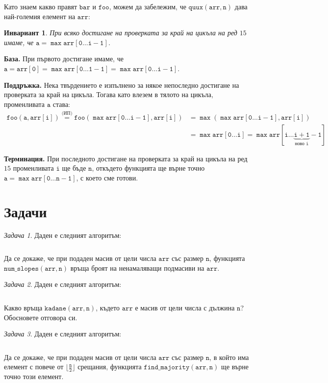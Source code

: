 \documentclass{article}
\theoremstyle{definition}
\theoremstyle{plain}
\newtheorem*{invariant}{Инвариант}
\theoremstyle{remark}
\newtheorem{problem}{Задача}
\theoremstyle{definition}
\begin{document}
Като знаем какво правят $\mathtt{bar}$ и $\mathtt{foo}$, можем да забележим, че $\mathtt{quux(arr, n)}$ дава най-големия елемент на $\mathtt{arr}$:
\begin{invariant}
    При всяко достигане на проверката за край на цикъла на ред $15$ имаме, че $\mathtt{a = \max arr[0 \dots i - 1]}$.
\end{invariant}

\textbf{База.}
При първото достигане имаме, че $\mathtt{a = arr[0] = \max arr[0 \dots 1 - 1] = \max arr[0 \dots i - 1]}$.

\textbf{Поддръжка.}
Нека твърдението е изпълнено за някое непоследно достигане на проверката за край на цикъла.
Тогава като влезем в тялото на цикъла, променливата $\mathtt{a}$ става:
\begin{align*}
    \mathtt{foo(a, arr[i]) \stackrel{\text{(ИП)}}{=} foo(\max arr[0 \dots i - 1], arr[i])} & = \mathtt{\max (\max arr[0 \dots i - 1], arr[i])}                                                  \\
                                                                                           & =\mathtt{\max arr[0 \dots i] = \max arr[i \dots \underbrace{\mathtt{i + 1}}_{\text{ново } i} - 1]}
\end{align*}

\textbf{Терминация.}
При последното достигане на проверката за край на цикъла на ред $15$ променливата $\mathtt{i}$ ще бъде $\mathtt{n}$, откъдето функцията ще върне точно $\mathtt{a = \max arr[0 \dots n - 1]}$, с което сме готови.

\section*{Задачи}

\begin{problem}
Даден е следният алгоритъм:
\inputminted[linenos]{c++}{algorithms/num_slopes.cpp}

Да се докаже, че при подаден масив от цели числа $\mathtt{arr}$ със размер $\mathtt{n}$, функцията $\mathtt{num\_slopes(arr, n)}$ връща броят на ненамаляващи подмасиви на $\mathtt{arr}$.
\end{problem}


\begin{problem}
Даден е следният алгоритъм:
\inputminted[linenos]{c++}{algorithms/kadane.cpp}

Какво връща $\mathtt{kadane(arr, n)}$, където $\mathtt{arr}$ е масив от цели числа с дължина $\mathtt{n}$?
Обосновете отговора си.
\end{problem}

\begin{problem}
Даден е следният алгоритъм:
\inputminted[linenos]{c++}{algorithms/find_majority.cpp}

Да се докаже, че при подаден масив от цели числа $\mathtt{arr}$ със размер $\mathtt{n}$, в който има елемент с повече от $\mathtt{\lfloor \frac{n}{2} \rfloor}$ срещания,
функцията $\mathtt{find\_majority(arr, n)}$ ще върне точно този елемент.
\end{problem}
\end{document}
